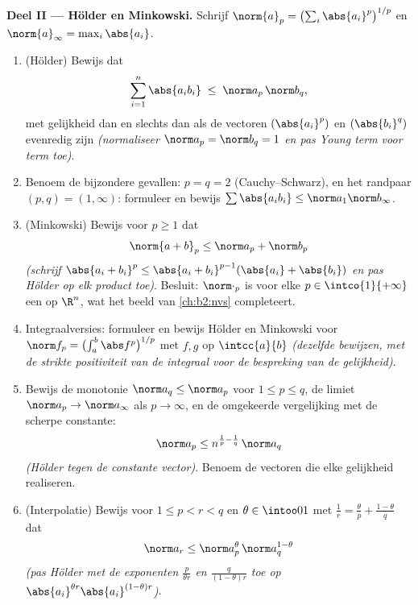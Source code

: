 \begin{problem}
\medskip
\noindent\textbf{Deel II --- Hölder en Minkowski.} Schrijf
$\norm{a}_p = \bigl(\sum_i \abs{a_i}^p\bigr)^{1/p}$ en
$\norm{a}_\infty = \max_i\abs{a_i}$.
\begin{enumerate}[resume]
  \item (Hölder) Bewijs dat
        \[
        \sum_{i=1}^{n}\abs{a_ib_i} \;\leq\;
        \norm a_p\,\norm b_q ,
        \]
        met gelijkheid dan en slechts dan als de vectoren
        $(\abs{a_i}^p)$ en $(\abs{b_i}^q)$ evenredig zijn
        \emph{(normaliseer $\norm a_p = \norm b_q = 1$ en pas
        Young term voor term toe)}.
  \item Benoem de bijzondere gevallen: $p = q = 2$
        (Cauchy--Schwarz), en het randpaar $(p, q) = (1, \infty)$:
        formuleer en bewijs $\sum\abs{a_ib_i} \leq \norm
        a_1\norm b_\infty$.
  \item (Minkowski) Bewijs voor $p \geq 1$ dat
        \[
        \norm{a + b}_p \leq \norm a_p + \norm b_p
        \]
        \emph{(schrijf $\abs{a_i + b_i}^p \leq \abs{a_i +
        b_i}^{p-1}(\abs{a_i} + \abs{b_i})$ en pas Hölder op elk
        product toe)}. Besluit: $\norm\cdot_p$ is voor elke $p \in
        \intco{1}{+\infty}$ een  op $\R^n$, wat het beeld van
        \cref{ch:b2:nvs} completeert.
  \item Integraalversies: formuleer en bewijs Hölder en Minkowski
        voor $\norm f_p = \bigl(\int_a^b\abs f^p\bigr)^{1/p}$ met
        $f, g$  op $\intcc{a}{b}$ \emph{(dezelfde
        bewijzen, met de strikte positiviteit van de integraal
        voor de bespreking van de gelijkheid)}.
  \item Bewijs de monotonie $\norm a_q \leq \norm a_p$ voor $1
        \leq p \leq q$, de limiet $\norm a_p \to \norm a_\infty$
        als $p \to \infty$, en de omgekeerde vergelijking met de
        scherpe constante:
        \[
        \norm a_p \leq n^{\frac1p - \frac1q}\,\norm a_q
        \]
        \emph{(Hölder tegen de constante vector)}. Benoem de
        vectoren die elke gelijkheid realiseren.
  \item (Interpolatie) Bewijs voor $1 \leq p < r < q$ en $\theta
        \in \intoo01$ met $\frac1r = \frac\theta p +
        \frac{1-\theta}q$ dat
        \[
        \norm a_r \leq \norm a_p^{\theta}\,
        \norm a_q^{1-\theta}
        \]
        \emph{(pas Hölder met de exponenten $\frac{p}{\theta r}$
        en $\frac{q}{(1-\theta)r}$ toe op
        $\abs{a_i}^{\theta r}\abs{a_i}^{(1-\theta)r}$)}.
\end{enumerate}


\end{problem}
